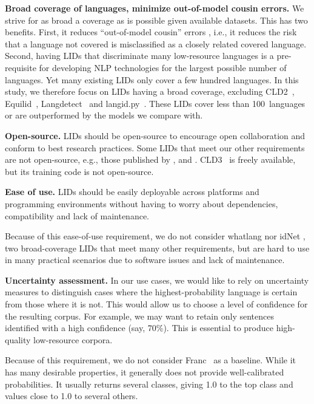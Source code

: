 \documentclass[11pt]{article}
\begin{document}
\textbf{Broad coverage of languages, minimize out-of-model cousin errors.} 
We strive for as broad a coverage as is possible given
available datasets. This has two benefits. First,
it reduces ``out-of-model cousin''
errors \cite{caswell-etal-2020-language, kreutzer-etal-2022-quality},
i.e., it reduces the risk that a language not covered is misclassified
as a closely related covered language.
Second, having LIDs that discriminate many low-resource languages is a pre-requisite
for developing NLP technologies for the largest possible number of languages.
Yet many existing LIDs only cover a few hundred
languages. In this study, we therefore focus on LIDs
having a broad
coverage, excluding
CLD2~\cite{mccandless2010accuracy},
Equilid~\cite{jurgens-etal-2017-incorporating}, 
Langdetect~\cite{shuyo2010language} and
langid.py~\cite{lui-baldwin-2012-langid}.
These LIDs cover less than 100~languages or are
outperformed by the models we compare with.

\textbf{Open-source.}
LIDs should be open-source to encourage
open collaboration and conform to best research practices.
Some LIDs that meet our other requirements
are not open-source, e.g., those published by
\citet{caswell-etal-2020-language}, \citet{bapna2022building} and \citet{kudugunta2023madlad}.
CLD3~\cite{botha-etal-2017-natural, salcianu2018compact}
is freely available, but its training code is not open-source.

\textbf{Ease of use.}
LIDs should be
easily deployable across platforms and programming environments
without having to worry about dependencies, compatibility
and lack of maintenance.

Because of this ease-of-use requirement, we do not consider
whatlang \citep{brown-2014-non, la-strings} nor idNet
\citep{dunn2020mapping}, two broad-coverage
LIDs that meet many other requirements, but are hard
to use in many practical scenarios due to software issues and lack of maintenance.

  
\textbf{Uncertainty assessment.} In our use cases, we
would like to rely on uncertainty measures to 
distinguish cases where the highest-probability language is
certain from those where it is not. This would allow us to
choose a level of confidence for the resulting corpus. For
example, we may want to retain only sentences
identified with a high confidence (say, 70\%). This is essential to
produce high-quality low-resource corpora.

Because of this requirement, we do not consider 
Franc~\citep{franc} as a baseline.
While it has many desirable properties, it generally does
not provide well-calibrated probabilities. It
usually returns several classes, giving 1.0 to the top
class and values close to 1.0 to several others.
\end{document}
